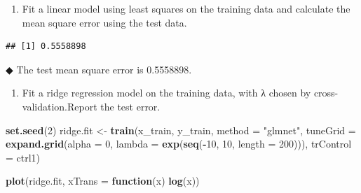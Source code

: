 \documentclass[]{article}
\newenvironment{Shaded}{\begin{snugshade}}{\end{snugshade}}
\newcommand{\ControlFlowTok}[1]{\textcolor[rgb]{0.13,0.29,0.53}{\textbf{#1}}}
\newcommand{\DataTypeTok}[1]{\textcolor[rgb]{0.13,0.29,0.53}{#1}}
\newcommand{\DecValTok}[1]{\textcolor[rgb]{0.00,0.00,0.81}{#1}}
\newcommand{\KeywordTok}[1]{\textcolor[rgb]{0.13,0.29,0.53}{\textbf{#1}}}
\newcommand{\NormalTok}[1]{#1}
\newcommand{\OperatorTok}[1]{\textcolor[rgb]{0.81,0.36,0.00}{\textbf{#1}}}
\newcommand{\StringTok}[1]{\textcolor[rgb]{0.31,0.60,0.02}{#1}}
\providecommand{\tightlist}{%
  \setlength{\itemsep}{0pt}\setlength{\parskip}{0pt}}
\begin{document}
\begin{enumerate}
\def\labelenumi{\alph{enumi})}
\tightlist
\item
  Fit a linear model using least squares on the training data and
  calculate the mean square error using the test data.
\end{enumerate}

\begin{Shaded}
\end{Shaded}

\begin{verbatim}
## [1] 0.5558898
\end{verbatim}

◆ The test mean square error is 0.5558898.

\begin{enumerate}
\def\labelenumi{\alph{enumi})}
\setcounter{enumi}{1}
\tightlist
\item
  Fit a ridge regression model on the training data, with λ chosen by
  cross-validation.Report the test error.
\end{enumerate}

\begin{Shaded}
\begin{Highlighting}[]
\KeywordTok{set.seed}\NormalTok{(}\DecValTok{2}\NormalTok{)}
\NormalTok{ridge.fit <-}\StringTok{ }\KeywordTok{train}\NormalTok{(x_train, y_train,}
                   \DataTypeTok{method =} \StringTok{"glmnet"}\NormalTok{,}
                   \DataTypeTok{tuneGrid =} \KeywordTok{expand.grid}\NormalTok{(}\DataTypeTok{alpha =} \DecValTok{0}\NormalTok{, }
                                          \DataTypeTok{lambda =} \KeywordTok{exp}\NormalTok{(}\KeywordTok{seq}\NormalTok{(}\OperatorTok{-}\DecValTok{10}\NormalTok{, }\DecValTok{10}\NormalTok{, }\DataTypeTok{length =} \DecValTok{200}\NormalTok{))),}
                   \DataTypeTok{trControl =}\NormalTok{ ctrl1)}

\KeywordTok{plot}\NormalTok{(ridge.fit, }\DataTypeTok{xTrans =} \ControlFlowTok{function}\NormalTok{(x) }\KeywordTok{log}\NormalTok{(x))}
\end{Highlighting}
\end{Shaded}
\end{document}
